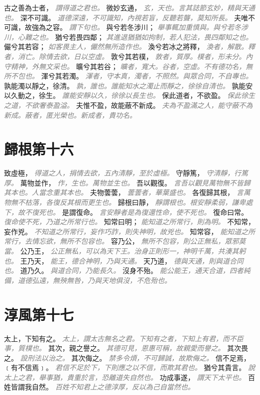 \documentclass[a4paper,zihao=-4,oneside,landscape,UTF8]{ctexart}
\newcommand{\zhushi}[1]{\scriptsize{\textit{\textcolor{gray}{#1}}}\normalsize}
\begin{document}
古之善為士者，
\zhushi{謂得道之君也。}
微妙玄通，
\zhushi{玄，天也。言其誌節玄妙，精與天通也。}
深不可識。
\zhushi{道德深遠，不可識知，內視若盲，反聽若聾，莫知所長。}
夫唯不可識，故強為之容。
\zhushi{謂下句也。}
與兮若冬涉川；
\zhushi{舉事輒加重慎與。與兮若冬涉川，心難之也。}
猶兮若畏四鄰；
\zhushi{其進退猶猶如拘制，若人犯法，畏四鄰知之也。}
儼兮其若容；
\zhushi{如客畏主人，儼然無所造作也。}
渙兮若冰之將釋，
\zhushi{渙者，解散。釋者，消亡。除情去欲，日以空虛。}
敦兮其若樸，
\zhushi{敦者，質厚。樸者，形未分。內守精神，外無文采也。}
曠兮其若谷；
\zhushi{曠者，寬大。谷者，空虛。不有德功名，無所不包也。}
渾兮其若濁。
\zhushi{渾者，守本真，濁者，不照然。與眾合同，不自專也。}
孰能濁以靜之，徐清。
\zhushi{孰，誰也。誰能知水之濁止而靜之，徐徐自清也。}
孰能安以久動之，徐生。
\zhushi{誰能安靜以久，徐徐以長生也。}
保此道者，不欲盈。
\zhushi{保此徐生之道，不欲奢泰盈溢。}
夫惟不盈，故能蔽不新成。
\zhushi{夫為不盈滿之人，能守蔽不為新成。蔽者，匿光榮也。新成者，貴功名。}


\section{歸根第十六}

致虛極，
\zhushi{得道之人，捐情去欲，五內清靜，至於虛極。}
守靜篤，
\zhushi{守清靜，行篤厚。}
萬物並作，
\zhushi{作，生也。萬物並生也。}
吾以觀復。
\zhushi{言吾以觀見萬物無不皆歸其本也。人當念重其本也。}
夫物蕓蕓，
\zhushi{蕓蕓者，華葉盛也。}
各復歸其根，
\zhushi{言萬物無不枯落，各復反其根而更生也。}
歸根曰靜，
\zhushi{靜謂根也。根安靜柔弱，謙卑處下，故不復死也。}
是謂復命。
\zhushi{言安靜者是為復還性命，使不死也。}
復命曰常。
\zhushi{復命使不死，乃道之所常行也。}
知常曰明；
\zhushi{能知道之所常行，則為明。}
不知常，妄作兇。
\zhushi{不知道之所常行，妄作巧詐，則失神明，故兇也。}
知常容，
\zhushi{能知道之所常行，去情忘欲，無所不包容也。}
容乃公，
\zhushi{無所不包容，則公正無私，眾邪莫當。}
公乃王，
\zhushi{公正無私，可以為天下王。治身正則形一，神明千萬，共湊其躬也。}
王乃天，
\zhushi{能王，德合神明，乃與天通。}
天乃道，
\zhushi{德與天通，則與道合同也。}
道乃久。
\zhushi{與道合同，乃能長久。}
沒身不殆。
\zhushi{能公能王，通天合道，四者純備，道德弘遠，無殃無咎，乃與天地俱沒，不危殆也。}


\section{淳風第十七}

太上，下知有之。
\zhushi{太上，謂太古無名之君。下知有之者，下知上有君，而不臣事，質樸也。}
其次，親之譽之。
\zhushi{其德可見，恩惠可稱，故親愛而譽之。}
其次畏之。
\zhushi{設刑法以治之。}
其次侮之。
\zhushi{禁多令煩，不可歸誠，故欺侮之。}
信不足焉，﹝有不信焉﹞。
\zhushi{君信不足於下，下則應之以不信，而欺其君也。}
猶兮其貴言。
\zhushi{說太上之君，舉事猶，貴重於言，恐離道失自然也。}
功成事遂，
\zhushi{謂天下太平也。}
百姓皆謂我自然。
\zhushi{百姓不知君上之德淳厚，反以為己自當然也。}
\end{document}
